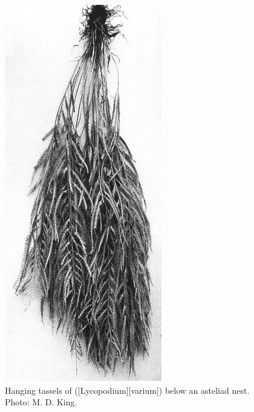 \begin{figure}[!b]
\begin{minipage}[t]{0.7\textwidth}
\begin{minipage}[t]{(\textwidth-\fgap) * \real{0.564}}
			\caption[Hanging tassels of clubmoss (\emph{Lycopodium varium})]{Hanging tassels of  ([Lycopodium][varium]) below an asteliad nest.
			Photo: M. D. King.}%
			\label{fig:42lycopodium}
		\end{minipage}\hspace{\fgap}%
		\begin{minipage}[t]{(\textwidth-\fgap) * \real{0.436}}
			\centering
			\includegraphics[width=\textwidth]{graphics/fig_043}

\end{minipage}
\end{minipage}
\end{figure}
